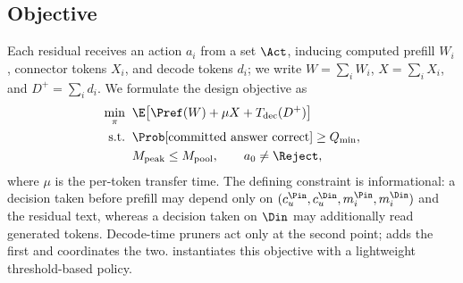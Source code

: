 \subsection{Objective}
\label{sec:objective}

Each residual receives an action $a_i$ from a set $\Act$, inducing computed prefill $W_i$, connector tokens $X_i$, and decode tokens $d_i$; we write $W{=}\sum_iW_i$, $X{=}\sum_iX_i$, and $D^{+}{=}\sum_id_i$.
We formulate the design objective as
\begin{equation}
\label{eq:objective}
\begin{aligned}
\min_{\pi}\;\; & \E\bigl[\Pref(W)+\mu X+T_{\mathrm{dec}}(D^{+})\bigr]\\
\text{s.t.}\;\; & \Prob[\text{committed answer correct}]\ge Q_{\min},\\
& M_{\mathrm{peak}}\le M_{\mathrm{pool}},\qquad a_0\neq\Reject,
\end{aligned}
\end{equation}
where $\mu$ is the per-token transfer time.
The defining constraint is informational: a decision taken before prefill may depend only on $(c_u^{\Pin},c_u^{\Din},m_i^{\Pin},m_i^{\Din})$ and the residual text, whereas a decision taken on $\Din$ may additionally read generated tokens.
Decode-time pruners act only at the second point; \sys adds the first and coordinates the two.
\sys instantiates this objective with a lightweight threshold-based policy.
